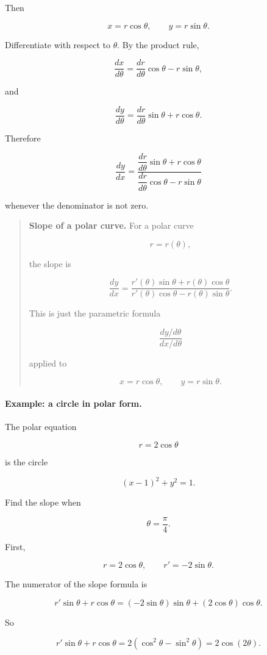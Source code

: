 Then

\[
x=r\cos\theta,
\qquad
y=r\sin\theta.
\]

Differentiate with respect to \(\theta\).  By the product rule,

\[
\frac{dx}{d\theta}
=
\frac{dr}{d\theta}\cos\theta-r\sin\theta,
\]

and

\[
\frac{dy}{d\theta}
=
\frac{dr}{d\theta}\sin\theta+r\cos\theta.
\]

Therefore

\[
\boxed{
\frac{dy}{dx}
=
\frac{\dfrac{dr}{d\theta}\sin\theta+r\cos\theta}
{\dfrac{dr}{d\theta}\cos\theta-r\sin\theta}
}
\]

whenever the denominator is not zero.

\begin{quote}
\textbf{Slope of a polar curve.}
For a polar curve

\[
r=r(\theta),
\]

the slope is

\[
\boxed{
\frac{dy}{dx}
=
\frac{r'(\theta)\sin\theta+r(\theta)\cos\theta}
{r'(\theta)\cos\theta-r(\theta)\sin\theta}.
}
\]

This is just the parametric formula

\[
\frac{dy/d\theta}{dx/d\theta}
\]

applied to

\[
x=r\cos\theta,
\qquad
y=r\sin\theta.
\]
\end{quote}

\paragraph{Example: a circle in polar form.}
The polar equation

\[
r=2\cos\theta
\]

is the circle

\[
(x-1)^2+y^2=1.
\]

Find the slope when

\[
\theta=\frac{\pi}{4}.
\]

First,

\[
r=2\cos\theta,
\qquad
r'=-2\sin\theta.
\]

The numerator of the slope formula is

\[
r'\sin\theta+r\cos\theta
=
(-2\sin\theta)\sin\theta+(2\cos\theta)\cos\theta.
\]

So

\[
r'\sin\theta+r\cos\theta
=
2(\cos^2\theta-\sin^2\theta)
=
2\cos(2\theta).
\]

